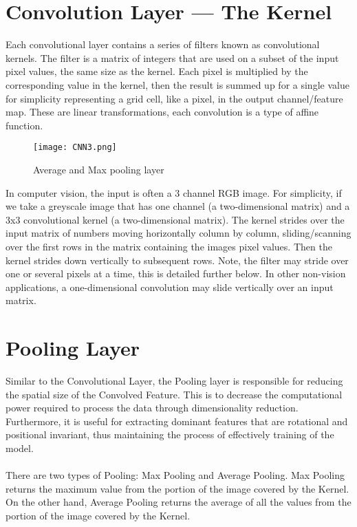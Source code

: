 \section{Convolution Layer — The Kernel}
    Each convolutional layer contains a series of filters known as convolutional kernels. The filter is a matrix of integers that are used on a subset of the input pixel values, the same size as the kernel. Each pixel is multiplied by the corresponding value in the kernel, then the result is summed up for a single value for simplicity representing a grid cell, like a pixel, in the output channel/feature map. These are linear transformations, each convolution is a type of affine function.

    \begin{figure}[h]
        \centering
        \texttt{[image: CNN3.png]}
        \caption{Average and Max pooling layer}
    \end{figure}

    In computer vision, the input is often a 3 channel RGB image. For simplicity, if we take a greyscale image that has one channel (a two-dimensional matrix) and a 3x3 convolutional kernel (a two-dimensional matrix). The kernel strides over the input matrix of numbers moving horizontally column by column, sliding/scanning over the first rows in the matrix containing the images pixel values. Then the kernel strides down vertically to subsequent rows. Note, the filter may stride over one or several pixels at a time, this is detailed further below. In other non-vision applications, a one-dimensional convolution may slide vertically over an input matrix.

\section{Pooling Layer}
    Similar to the Convolutional Layer, the Pooling layer is responsible for reducing the spatial size of the Convolved Feature. This is to decrease the computational power required to process the data through dimensionality reduction. Furthermore, it is useful for extracting dominant features that are rotational and positional invariant, thus maintaining the process of effectively training of the model.
\\ \\
    There are two types of Pooling: Max Pooling and Average Pooling. Max Pooling returns the maximum value from the portion of the image covered by the Kernel. On the other hand, Average Pooling returns the average of all the values from the portion of the image covered by the Kernel.

